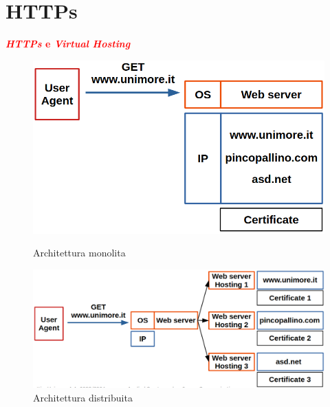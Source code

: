 \section{HTTPs}

\begin{flushleft}

    \textcolor{red}{\textbf{\textit{HTTPs} e \textit{Virtual Hosting}}} \\

    \begin{figure}[h]
        \centering
        \begin{minipage}[t]{0.45\textwidth}
            \includegraphics[width=\textwidth]{img/https_vh_1.png}
            \caption{Architettura monolita}
        \end{minipage}
        \hfill
        \begin{minipage}[t]{0.45\textwidth}
            \includegraphics[width=\textwidth]{img/https_vh_2.png}
            \caption{Architettura distribuita}
        \end{minipage}
    \end{figure}


\end{flushleft}
